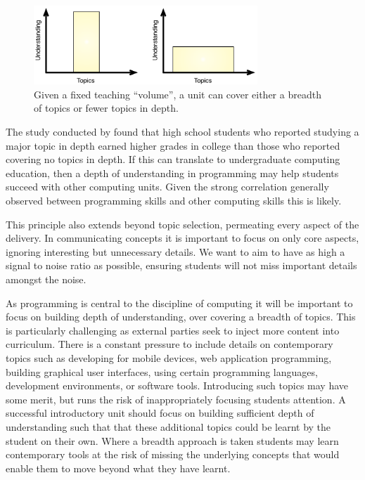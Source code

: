\begin{figure}[htbp]
	\centering
	\includegraphics[width=0.75\textwidth]{DepthOrBreadth}
	\caption{Given a fixed teaching ``volume'', a unit can cover either a breadth of topics or fewer topics in depth.}
	\label{fig:depth}
\end{figure}

%
%


The study conducted by \citet{Schwartz:2009} found that high school students who reported studying a major topic in depth earned higher grades in college than those who reported covering no topics in depth. If this can translate to undergraduate computing education, then a depth of understanding in programming may help students succeed with other computing units. Given the strong correlation generally observed between programming skills and other computing skills \cite{McGettrick:2005} this is likely.

This principle also extends beyond topic selection, permeating every aspect of the delivery. In communicating concepts it is important to focus on only core aspects, ignoring interesting but unnecessary details. We want to aim to have as high a signal to noise ratio \cite{Shannon:1949} as possible, ensuring students will not miss important details amongst the noise.

As programming is central to the discipline of computing \cite{McGettrick:2005} it will be important to focus on building depth of understanding, over covering a breadth of topics. This is particularly challenging as external parties seek to inject more content into curriculum. There is a constant pressure to include details on contemporary topics such as developing for mobile devices, web application programming, building graphical user interfaces, using certain programming languages, development environments, or software tools. Introducing such topics may have some merit, but runs the risk of inappropriately focusing students attention. A successful introductory unit should focus on building sufficient depth of understanding such that that these additional topics could be learnt by the student on their own. Where a breadth approach is taken students may learn contemporary tools at the risk of missing the underlying concepts that would enable them to move beyond what they have learnt.

